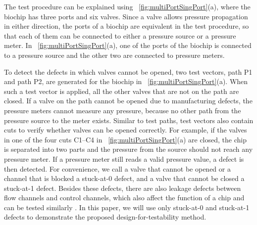 
The test procedure can be explained using
\figname~\ref{fig:multiPortSingPort}(a), where the biochip has three ports and
six valves.  
Since a valve allows pressure propagation in either direction, the ports of a
biochip are equivalent in the test procedure, so that each of them can be
connected to either a pressure source or a pressure meter.  In 
\figname~\ref{fig:multiPortSingPort}(a), 
one of the ports of the biochip is connected to a pressure source 
and the other two are connected to pressure meters. 

To detect the defects in which valves cannot be opened,
two test vectors, path P1 and path P2, are generated for the biochip in  
\figname~\ref{fig:multiPortSingPort}(a). When such a test vector is applied, all
the other valves that are not on the path are closed. If a valve on the path
cannot be opened due to manufacturing defects, the pressure meters cannot
measure any pressure, because no other path from the pressure source to the
meter exists. Similar to test paths, test vectors also contain cuts to verify
whether valves can be opened correctly. For example, if the valves in 
one of the four cuts
C1--C4 in \figname~\ref{fig:multiPortSingPort}(a) are closed, the chip is
separated into two parts and the pressure from the source should not reach any
pressure meter.  If a pressure meter still reads a valid pressure value, a
defect is then detected. For convenience, we call a valve that cannot be opened
or a channel that is blocked a stuck-at-0 defect, and a valve that cannot be
closed a stuck-at-1 defect. Besides these defects, there are also leakage
defects between flow channels and control channels, which also affect the
function of a chip and can be tested similarly \cite{HuYHC14}. In this paper,
we will use only stuck-at-0 and stuck-at-1 defects to demonstrate the proposed
design-for-testability method.

